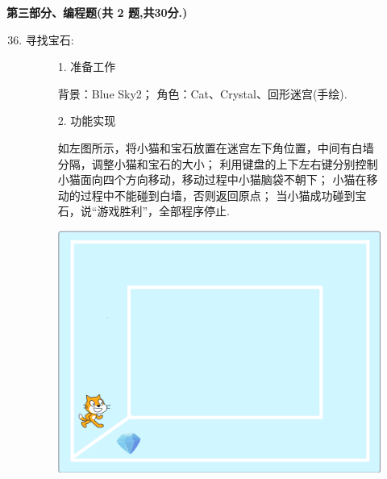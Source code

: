 \documentclass[10pt, a4paper]{article}
\begin{document}
    \newpage
    {\noindent \textbf{第三部分、编程题(共 2 题,共30分.)}}
    \begin{enumerate}
        \setcounter{enumi}{35}
        
        \item 寻找宝石:
        \begin{figure}[htbp]
            \begin{minipage}{.6\textwidth}
                1. 准备工作
                \begin{tasks}[label = (\arabic*)]
                    \task 背景：Blue Sky2；
                    \task 角色：Cat、Crystal、回形迷宫(手绘).
                \end{tasks}
                2. 功能实现
                \begin{tasks}[label = (\arabic*)]
                    \task 如左图所示，将小猫和宝石放置在迷宫左下角位置，中间有白墙分隔，调整小猫和宝石的大小；
                    \task 利用键盘的上下左右键分别控制小猫面向四个方向移动，移动过程中小猫脑袋不朝下；
                    \task 小猫在移动的过程中不能碰到白墙，否则返回原点；
                    \task 当小猫成功碰到宝石，说“游戏胜利”，全部程序停止.
                \end{tasks}
            \end{minipage}
            \begin{minipage}{.37\textwidth}
                \centering
                \includegraphics[width=\textwidth]{36.png}
            \end{minipage}
        \end{figure}


\end{enumerate}
\end{document}
